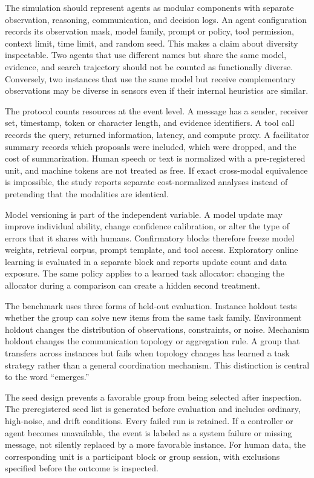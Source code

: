\documentclass[conference]{IEEEtran}
\begin{document}
The simulation should represent agents as modular components with separate observation, reasoning, communication, and decision logs. An agent configuration records its observation mask, model family, prompt or policy, tool permission, context limit, time limit, and random seed. This makes a claim about diversity inspectable. Two agents that use different names but share the same model, evidence, and search trajectory should not be counted as functionally diverse. Conversely, two instances that use the same model but receive complementary observations may be diverse in sensors even if their internal heuristics are similar.

The protocol counts resources at the event level. A message has a sender, receiver set, timestamp, token or character length, and evidence identifiers. A tool call records the query, returned information, latency, and compute proxy. A facilitator summary records which proposals were included, which were dropped, and the cost of summarization. Human speech or text is normalized with a pre-registered unit, and machine tokens are not treated as free. If exact cross-modal equivalence is impossible, the study reports separate cost-normalized analyses instead of pretending that the modalities are identical.

Model versioning is part of the independent variable. A model update may improve individual ability, change confidence calibration, or alter the type of errors that it shares with humans. Confirmatory blocks therefore freeze model weights, retrieval corpus, prompt template, and tool access. Exploratory online learning is evaluated in a separate block and reports update count and data exposure. The same policy applies to a learned task allocator: changing the allocator during a comparison can create a hidden second treatment.

The benchmark uses three forms of held-out evaluation. Instance holdout tests whether the group can solve new items from the same task family. Environment holdout changes the distribution of observations, constraints, or noise. Mechanism holdout changes the communication topology or aggregation rule. A group that transfers across instances but fails when topology changes has learned a task strategy rather than a general coordination mechanism. This distinction is central to the word ``emerges.''

The seed design prevents a favorable group from being selected after inspection. The preregistered seed list is generated before evaluation and includes ordinary, high-noise, and drift conditions. Every failed run is retained. If a controller or agent becomes unavailable, the event is labeled as a system failure or missing message, not silently replaced by a more favorable instance. For human data, the corresponding unit is a participant block or group session, with exclusions specified before the outcome is inspected.
\end{document}
